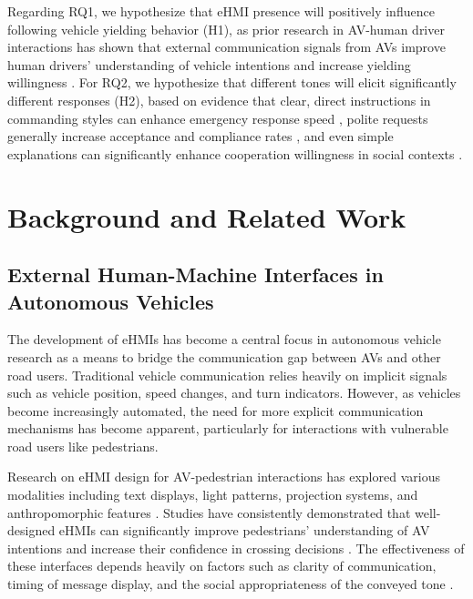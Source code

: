 \documentclass[manuscript,review]{acmart}
\begin{document}
Regarding RQ1, we hypothesize that eHMI presence will positively influence following vehicle yielding behavior (H1), as prior research in AV-human driver interactions has shown that external communication signals from AVs improve human drivers' understanding of vehicle intentions and increase yielding willingness \cite{colley2021investigating, habibovic2018communicating}. For RQ2, we hypothesize that different tones will elicit significantly different responses (H2), based on evidence that clear, direct instructions in commanding styles can enhance emergency response speed \cite{merat2012highly, parasuraman1997humans}, polite requests generally increase acceptance and compliance rates \cite{brown1987politeness}, and even simple explanations can significantly enhance cooperation willingness in social contexts \cite{burger2004coincidence}.

\section{Background and Related Work}

\subsection{External Human-Machine Interfaces in Autonomous Vehicles}

The development of eHMIs has become a central focus in autonomous vehicle research as a means to bridge the communication gap between AVs and other road users. Traditional vehicle communication relies heavily on implicit signals such as vehicle position, speed changes, and turn indicators. However, as vehicles become increasingly automated, the need for more explicit communication mechanisms has become apparent, particularly for interactions with vulnerable road users like pedestrians.

Research on eHMI design for AV-pedestrian interactions has explored various modalities including text displays, light patterns, projection systems, and anthropomorphic features \cite{bazilinskyy2019survey, dey2020taming}. Studies have consistently demonstrated that well-designed eHMIs can significantly improve pedestrians' understanding of AV intentions and increase their confidence in crossing decisions \cite{dey2019pedestrian, hollaender2019investigating}. The effectiveness of these interfaces depends heavily on factors such as clarity of communication, timing of message display, and the social appropriateness of the conveyed tone \cite{carmona2021ehmi, mahadevan2018communicating}.
\end{document}
